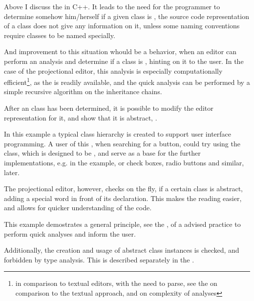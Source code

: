 Above I discuss the  in C++. It leads to the need for the programmer to determine somehow him/herself 
if a given class is , the source code representation of a class does not give any information on it, 
unless some naming conventions require  classes to be named specially.

And improvement to this situation whould be a behavior, when an editor can perform an analysis and 
determine if a class is , hinting on it to the user. In the case of the projectional
editor, this analysis is especially computationally efficient\footnote{in comparison to textual editors, with the need to 
parse, see the  on comparison to the textual approach, and  on complexity of analyses}, 
as the  is readily available, and the quick  analysis can be performed by a simple recursive algorithm on the inheritance chains.

After an  class has been determined, it is possible to modify the editor representation for it, 
and show that it is abstract, .

In this example a typical class hierarchy is created to support user interface programming. A user of this , when 
searching for a button, could try using the  class, which is designed to be , and serve as a 
base for the further implementations, e.g.  in the example, or check boxes, radio buttons and similar,
later.


The projectional editor, however, checks on the fly, if a certain class is abstract, adding a special  word 
in front of its declaration. This makes the reading easier, and allows for quicker understanding of the code. 

This example demostrates a general principle, see  the , of a advised practice to 
perform quick analyses and inform the user.

Additionally, the creation and usage of abstract class instances is checked, and forbidden by type analysis. This is 
described separately in the .
